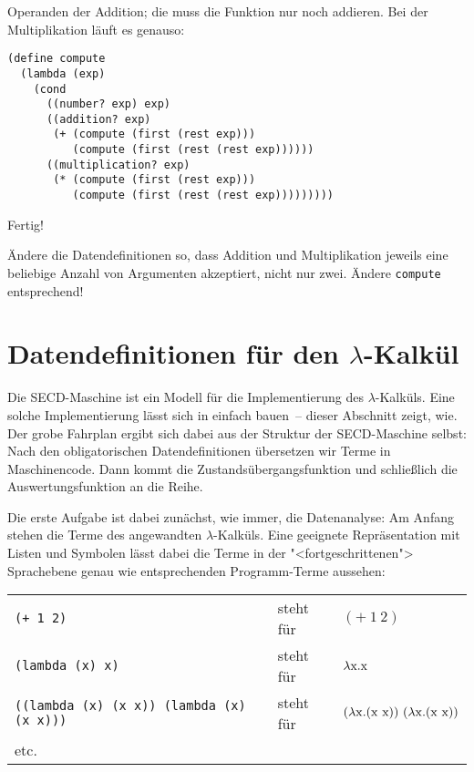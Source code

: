 Operanden der Addition; die muss die Funktion nur noch addieren.  Bei
der Multiplikation läuft es genauso:
%
\begin{lstlisting}
(define compute
  (lambda (exp)
    (cond
      ((number? exp) exp)
      ((addition? exp)
       (+ (compute (first (rest exp)))
          (compute (first (rest (rest exp))))))
      ((multiplication? exp)
       (* (compute (first (rest exp)))
          (compute (first (rest (rest exp)))))))))
\end{lstlisting}
% 
Fertig!
%
\begin{aufgabeinline}
  Ändere die Datendefinitionen so, dass Addition und Multiplikation
  jeweils eine beliebige Anzahl von Argumenten akzeptiert, nicht nur
  zwei.  Ändere \lstinline{compute} entsprechend!
\end{aufgabeinline}

\section{Datendefinitionen für den $\lambda$-Kalkül}
\label{sec:datendefinitionen-lambda}

%
Die SECD-Maschine ist ein Modell für die Implementierung des
$\lambda$-Kalküls.  Eine solche Implementierung lässt sich in einfach
bauen~-- dieser Abschnitt zeigt, wie.  Der grobe Fahrplan ergibt sich
dabei aus der Struktur der SECD-Maschine selbst: Nach den
obligatorischen Datendefinitionen übersetzen wir Terme in
Maschinencode.  Dann kommt die Zustandsübergangsfunktion und
schließlich die Auswertungsfunktion an die Reihe.

Die erste Aufgabe ist dabei zunächst, wie immer, die Datenanalyse: Am
Anfang stehen die Terme des angewandten $\lambda$-Kalküls.  Eine
geeignete Repräsentation mit Listen und Symbolen lässt dabei die Terme
in der "<fortgeschrittenen"> Sprachebene genau wie entsprechenden
Programm-Terme aussehen:

\noindent\begin{tabular}{lll}
  \texttt{(+ 1 2)} & steht für & $(+~1~2)$\\
  \texttt{(lambda (x) x)} & steht für & $\lambda \mathrm x.\mathrm x$\\
  \texttt{((lambda (x) (x x)) (lambda (x) (x x)))} & steht für &
  $(\lambda \mathrm x.(\mathrm x~\mathrm x))~(\lambda \mathrm x.(\mathrm x~\mathrm x))$\\
  etc.
\end{tabular}

